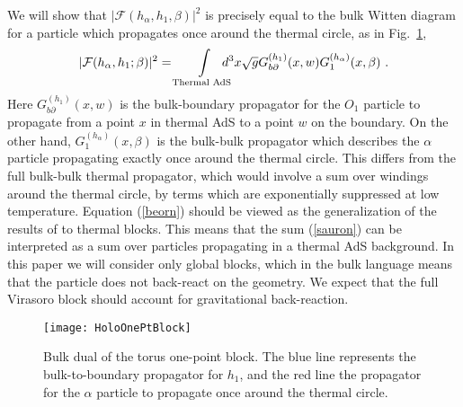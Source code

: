 \documentclass[12pt]{article}
\newcommand\rref[1]{(\ref{#1})}
\begin{document}
We will show that $|\mathcal{F}(h_\alpha, h_1, \beta)|^2$ is precisely equal to the bulk Witten diagram for a particle which propagates once around the thermal circle, as in Fig.~\ref{fig:block},
\begin{equation}\label{beorn}
|\mathcal{F}(h_\alpha, h_1; \beta)|^2 = \int\displaylimits_\text{Thermal AdS} \mkern-20mu d^3x \sqrt{g} G^{(h_1)}_{b\partial} (x,w) G_1^{(h_\alpha)}(x,\beta)~.
\end{equation}
Here $G^{(h_1)}_{b\partial} (x,w)$ is the bulk-boundary propagator for the $O_1$ particle to propagate from a point $x$ in  thermal AdS to a point $w$ on the boundary.  On the other hand, $G_1^{(h_\alpha)}(x,\beta)$ is the bulk-bulk propagator which describes the $\alpha$ particle propagating exactly once around the thermal circle.
This differs from the full bulk-bulk thermal propagator, which would involve a sum over windings around the thermal circle, by terms which are exponentially suppressed at low temperature.
Equation \rref{beorn} should be viewed as the generalization of the results of \cite{Hijano:2015zsa} to thermal blocks.
This means that the sum \rref{sauron} can be interpreted as a sum over particles propagating in a thermal AdS background.
In this paper we will consider only global blocks, which in the bulk language means that the particle does not back-react on the geometry.  We expect that the full Virasoro block should account for gravitational back-reaction.

 \begin{figure}
 \centering
  \texttt{[image: HoloOnePtBlock]}
 \caption{Bulk dual of the torus one-point block.
 The blue line represents the bulk-to-boundary propagator for $h_1$, and the red line the propagator for the $\alpha$ particle to propagate once around the thermal circle.  \label{fig:block}
}
 \end{figure}
\end{document}
